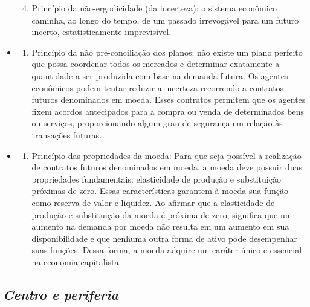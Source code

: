 \documentclass[a4paper,12pt]{article}
\providecommand{\tightlist}{%
  \setlength{\itemsep}{0pt}\setlength{\parskip}{0pt}}\usepackage{longtable,booktabs,array}
\begin{document}
\begin{itemize}
\begin{enumerate}
  \setcounter{enumi}{3}
  \tightlist
  \item
    Princípio da não-ergodicidade (da incerteza): o sistema econômico
    caminha, ao longo do tempo, de um passado irrevogável para um futuro
    incerto, estatisticamente imprevisível.
  \end{enumerate}
\item
  \begin{enumerate}
  \def\labelenumi{(\alph{enumi})}
  \setcounter{enumi}{21}
  \tightlist
  \item
    Princípio da não pré-conciliação dos planos: não existe um plano
    perfeito que possa coordenar todos os mercados e determinar
    exatamente a quantidade a ser produzida com base na demanda futura.
    Os agentes econômicos podem tentar reduzir a incerteza recorrendo a
    contratos futuros denominados em moeda. Esses contratos permitem que
    os agentes fixem acordos antecipados para a compra ou venda de
    determinados bens ou serviços, proporcionando algum grau de
    segurança em relação às transações futuras.
  \end{enumerate}
\item
  \begin{enumerate}
  \def\labelenumi{(\roman{enumi})}
  \setcounter{enumi}{5}
  \tightlist
  \item
    Princípio das propriedades da moeda: Para que seja possível a
    realização de contratos futuros denominados em moeda, a moeda deve
    possuir duas propriedades fundamentais: elasticidade de produção e
    substituição próximas de zero. Essas características garantem à
    moeda sua função como reserva de valor e liquidez. Ao afirmar que a
    elasticidade de produção e substituição da moeda é próxima de zero,
    significa que um aumento na demanda por moeda não resulta em um
    aumento em sua disponibilidade e que nenhuma outra forma de ativo
    pode desempenhar suas funções. Dessa forma, a moeda adquire um
    caráter único e essencial na economia capitalista.
  \end{enumerate}
\end{itemize}

\hypertarget{centro-e-periferia}{%
\subsection{\texorpdfstring{\emph{Centro e
periferia}}{Centro e periferia}}\label{centro-e-periferia}}
\end{document}
